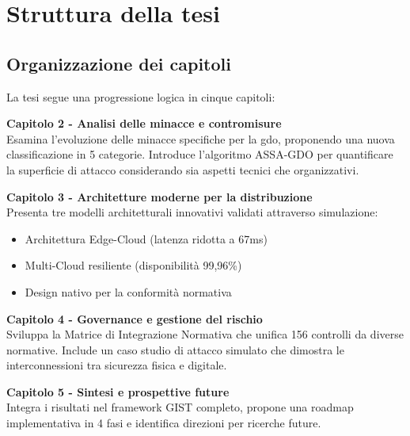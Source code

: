 \section{\texorpdfstring{Struttura della tesi}{1.6 - Struttura della tesi}}
\label{sec:struttura_tesi}

\subsection{\texorpdfstring{Organizzazione dei capitoli}{1.6.1 - Organizzazione dei capitoli}}
\label{subsec:organizzazione}

La tesi segue una progressione logica in cinque capitoli:

\textbf{Capitolo 2 - Analisi delle minacce e contromisure}\\
Esamina l'evoluzione delle minacce specifiche per la \gls{gdo}, proponendo una nuova classificazione in 5 categorie. Introduce l'algoritmo ASSA-GDO per quantificare la superficie di attacco considerando sia aspetti tecnici che organizzativi.

\textbf{Capitolo 3 - Architetture moderne per la distribuzione}\\
Presenta tre modelli architetturali innovativi validati attraverso simulazione:
\begin{itemize}
\item Architettura Edge-Cloud (latenza ridotta a 67ms)
\item Multi-Cloud resiliente (disponibilità 99,96\%)
\item Design nativo per la conformità normativa
\end{itemize}

\textbf{Capitolo 4 - Governance e gestione del rischio}\\
Sviluppa la Matrice di Integrazione Normativa che unifica 156 controlli da diverse normative. Include un caso studio di attacco simulato che dimostra le interconnessioni tra sicurezza fisica e digitale.

\textbf{Capitolo 5 - Sintesi e prospettive future}\\
Integra i risultati nel framework GIST completo, propone una roadmap implementativa in 4 fasi e identifica direzioni per ricerche future.

